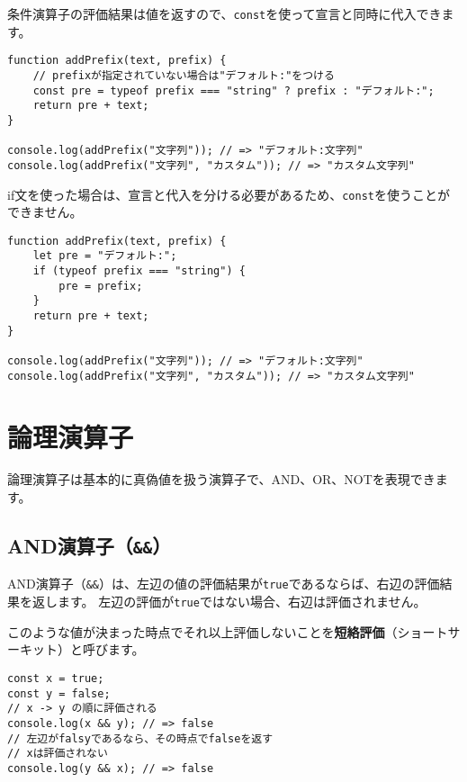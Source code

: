 条件演算子の評価結果は値を返すので、\texttt{const}を使って宣言と同時に代入できます。

\begin{lstlisting}
function addPrefix(text, prefix) {
    // prefixが指定されていない場合は"デフォルト:"をつける
    const pre = typeof prefix === "string" ? prefix : "デフォルト:";
    return pre + text;
}

console.log(addPrefix("文字列")); // => "デフォルト:文字列"
console.log(addPrefix("文字列", "カスタム")); // => "カスタム文字列"
\end{lstlisting}

if文を使った場合は、宣言と代入を分ける必要があるため、\texttt{const}を使うことができません。

\begin{lstlisting}
function addPrefix(text, prefix) {
    let pre = "デフォルト:";
    if (typeof prefix === "string") {
        pre = prefix;
    }
    return pre + text;
}

console.log(addPrefix("文字列")); // => "デフォルト:文字列"
console.log(addPrefix("文字列", "カスタム")); // => "カスタム文字列"
\end{lstlisting}

\hypertarget{logical-operator}{%
\section{論理演算子}\label{logical-operator}}

論理演算子は基本的に真偽値を扱う演算子で、AND、OR、NOTを表現できます。

\hypertarget{and-operator}{%
\subsection{\texorpdfstring{AND演算子（\texttt{\&\&}）}{AND演算子（\&\&）}}\label{and-operator}}

AND演算子（\texttt{\&\&}）は、左辺の値の評価結果が\texttt{true}であるならば、右辺の評価結果を返します。
左辺の評価が\texttt{true}ではない場合、右辺は評価されません。

このような値が決まった時点でそれ以上評価しないことを\textbf{短絡評価}（ショートサーキット）と呼びます。

\begin{lstlisting}
const x = true;
const y = false;
// x -> y の順に評価される
console.log(x && y); // => false
// 左辺がfalsyであるなら、その時点でfalseを返す
// xは評価されない
console.log(y && x); // => false
\end{lstlisting}

